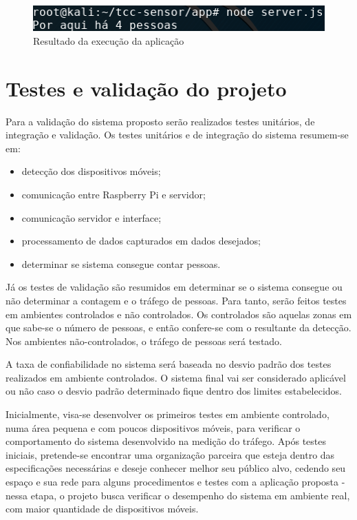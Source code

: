 \begin{figure}[!h]
  \caption{\label{exec-bash}Resultado da execução da aplicação}
  \begin{center}
    \includegraphics[width=1.0\textwidth]{img/bash.png}
  \end{center}
\end{figure}

\section{Testes e validação do projeto}
Para a validação do sistema proposto serão realizados testes unitários, de integração e
validação. Os testes unitários e de integração do sistema resumem-se em:

\begin{itemize}
  \item detecção dos dispositivos móveis;
  \item comunicação entre Raspberry Pi e servidor;
  \item comunicação servidor e interface;
  \item processamento de dados capturados em dados desejados;
  \item determinar se sistema consegue contar pessoas.
\end{itemize}

Já os testes de validação são resumidos em determinar se o sistema consegue ou
não determinar a contagem e o tráfego de pessoas. Para tanto, serão feitos testes em
ambientes controlados e não controlados. Os controlados são
aquelas zonas em que sabe-se o número de pessoas, e então confere-se com o resultante da
detecção. Nos ambientes não-controlados, o tráfego de pessoas será testado.

A taxa de confiabilidade no sistema será baseada no desvio padrão dos testes
realizados em ambiente controlados.
O sistema final vai ser considerado aplicável ou não caso o desvio
padrão determinado fique dentro
dos limites estabelecidos.

Inicialmente, visa-se desenvolver os primeiros testes em ambiente
controlado, numa área pequena e com poucos dispositivos móveis, para verificar o
comportamento do sistema desenvolvido na medição do tráfego. Após testes
iniciais, pretende-se encontrar uma organização parceira que esteja dentro das
especificações necessárias e deseje conhecer melhor seu público alvo, cedendo
seu espaço e sua rede para alguns procedimentos e testes com a aplicação proposta
 - nessa etapa, o projeto busca verificar o desempenho do
sistema em ambiente real, com maior quantidade de dispositivos móveis.

